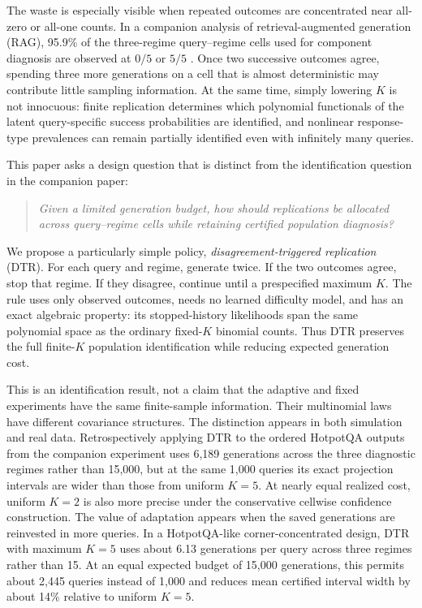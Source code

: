 \documentclass[11pt]{article}
\theoremstyle{remark}
\begin{document}
The waste is especially visible when repeated outcomes are concentrated near all-zero or all-one counts. In a companion analysis of retrieval-augmented generation (RAG), 95.9\% of the three-regime query--regime cells used for component diagnosis are observed at $0/5$ or $5/5$ \citep{Hait2026Partial}. Once two successive outcomes agree, spending three more generations on a cell that is almost deterministic may contribute little sampling information. At the same time, simply lowering $K$ is not innocuous: finite replication determines which polynomial functionals of the latent query-specific success probabilities are identified, and nonlinear response-type prevalences can remain partially identified even with infinitely many queries.

This paper asks a design question that is distinct from the identification question in the companion paper:
\begin{quote}
\emph{Given a limited generation budget, how should replications be allocated across query--regime cells while retaining certified population diagnosis?}
\end{quote}

We propose a particularly simple policy, \emph{disagreement-triggered replication} (DTR). For each query and regime, generate twice. If the two outcomes agree, stop that regime. If they disagree, continue until a prespecified maximum $K$. The rule uses only observed outcomes, needs no learned difficulty model, and has an exact algebraic property: its stopped-history likelihoods span the same polynomial space as the ordinary fixed-$K$ binomial counts. Thus DTR preserves the full finite-$K$ population identification while reducing expected generation cost.

This is an identification result, not a claim that the adaptive and fixed experiments have the same finite-sample information. Their multinomial laws have different covariance structures. The distinction appears in both simulation and real data. Retrospectively applying DTR to the ordered HotpotQA outputs from the companion experiment uses 6,189 generations across the three diagnostic regimes rather than 15,000, but at the same 1,000 queries its exact projection intervals are wider than those from uniform $K=5$. At nearly equal realized cost, uniform $K=2$ is also more precise under the conservative cellwise confidence construction. The value of adaptation appears when the saved generations are reinvested in more queries. In a HotpotQA-like corner-concentrated design, DTR with maximum $K=5$ uses about 6.13 generations per query across three regimes rather than 15. At an equal expected budget of 15,000 generations, this permits about 2,445 queries instead of 1,000 and reduces mean certified interval width by about 14\% relative to uniform $K=5$.
\end{document}
